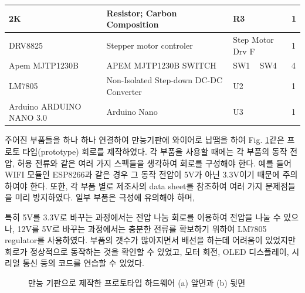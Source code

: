\begin{table}[h]
\begin{tabular}{l|l|l|l}
								\midrule[0.6pt]
		2K                       & Resistor; Carbon Composition                  & R3                                       & 1        \\
								\midrule[0.6pt]
		DRV8825                  & Stepper motor controler                       & Step Motor Drv F                         & 1        \\
								\midrule[0.6pt]
		Apem MJTP1230B           & APEM MJTP1230B SWITCH                         & SW1 ~ SW4                       & 4        \\
								\midrule[0.6pt]
		LM7805                   & Non-Isolated Step-down DC-DC Converter        & U2                                       & 1        \\
								\midrule[0.6pt]
		Arduino ARDUINO NANO 3.0 & Arduino Nano                                  & U3                                       & 1 \\ 
								\bottomrule[1pt]     
	\end{tabular}
	\label{table:parts}

\end{table}

주어진 부품들을 하나 하나 연결하여 만능기판에 와이어로 납땜을 하여 Fig. \ref{fig:prototype}\과 같은 프로토 타입(prototype) 회로를 제작하였다. 각 부품을 사용할 때에는 각 부품의 동작 전압, 허용 전류와 같은 여러 가지 스펙들을 생각하여 회로를 구성해야 한다. 예를 들어 WIFI 모듈인 ESP8266과 같은 경우 그 동작 전압이 5V가 아닌 3.3V이기 때문에 주의하여야 한다. 또한, 각 부품 별로 제조사의 data sheet를 참조하여 여러 가지 문제점들을 미리 방지하였다. 일부 부품은 극성에 유의해야 하며, 

특히 5V를 3.3V로 바꾸는 과정에서는 전압 나눔 회로를 이용하여 전압을 나눌 수 있으나, 12V를 5V로 바꾸는 과정에서는 충분한 전류를 확보하기 위하여 LM7805 regulator를 사용하였다. 부품의 갯수가 많아지면서 배선을 하는데 어려움이 있었지만 회로가 정상적으로 동작하는 것을 확인할 수 있었고, 모터 회전, OLED 디스플레이, 시리얼 통신 등의 코드를 연습할 수 있었다.

\begin{figure}[h]
	\begin{center}
		\caption{만능 기판으로 제작한 프로토타입 하드웨어 (a) 앞면과 (b) 뒷면}
		\label{fig:prototype}
	\end{center}
\end{figure}

